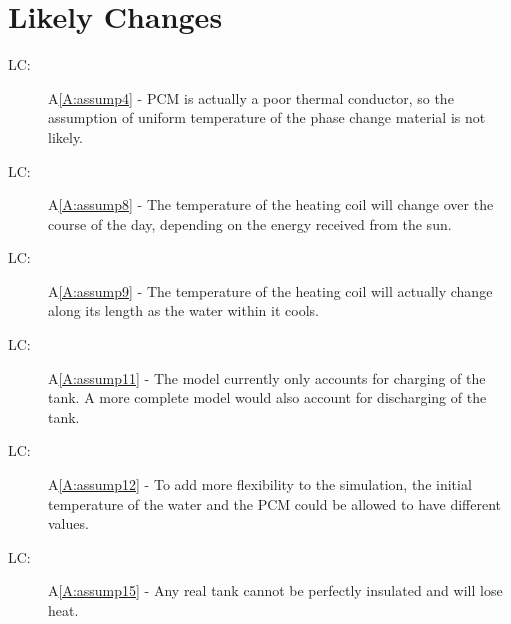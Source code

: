 \documentclass[12pt]{article}
\newcounter{lcnum}
\newcommand{\lcthelcnum}{LC\thelcnum}
\begin{document}
\section{Likely Changes}
\label{Sec:LCs}
\begin{description}
\item[\lcthelcnum\label{LC:likeChg1}:]A\ref{A:assump4} - PCM is actually a poor thermal conductor, so the assumption of uniform temperature of the phase change material is not likely.
\end{description}
\begin{description}
\item[\lcthelcnum\label{LC:likeChg2}:]A\ref{A:assump8} - The temperature of the heating coil will change over the course of the day, depending on the energy received from the sun.
\end{description}
\begin{description}
\item[\lcthelcnum\label{LC:likeChg3}:]A\ref{A:assump9} - The temperature of the heating coil will actually change along its length as the water within it cools.
\end{description}
\begin{description}
\item[\lcthelcnum\label{LC:likeChg4}:]A\ref{A:assump11} - The model currently only accounts for charging of the tank. A more complete model would also account for discharging of the tank.
\end{description}
\begin{description}
\item[\lcthelcnum\label{LC:likeChg5}:]A\ref{A:assump12} - To add more flexibility to the simulation, the initial temperature of the water and the PCM could be allowed to have different values.
\end{description}
\begin{description}
\item[\lcthelcnum\label{LC:likeChg6}:]A\ref{A:assump15} - Any real tank cannot be perfectly insulated and will lose heat.
\end{description}
\end{document}
